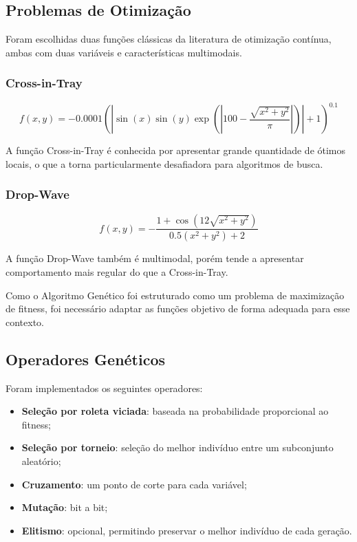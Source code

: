 \documentclass[a4paper,12pt]{article}
\begin{document}
\subsection{Problemas de Otimização}

Foram escolhidas duas funções clássicas da literatura de otimização contínua, ambas com duas variáveis e características multimodais.

\subsubsection{Cross-in-Tray}

\begin{equation}
f(x,y) =
-0.0001
\left(
\left|
\sin(x)\sin(y)
\exp\left(
\left|
100 - \frac{\sqrt{x^2 + y^2}}{\pi}
\right|
\right)
\right|
+ 1
\right)^{0.1}
\end{equation}

A função Cross-in-Tray é conhecida por apresentar grande quantidade de ótimos locais, o que a torna particularmente desafiadora para algoritmos de busca.

\subsubsection{Drop-Wave}

\begin{equation}
f(x,y) =
-
\frac{
1 + \cos(12\sqrt{x^2 + y^2})
}{
0.5(x^2 + y^2) + 2
}
\end{equation}

A função Drop-Wave também é multimodal, porém tende a apresentar comportamento mais regular do que a Cross-in-Tray.

Como o Algoritmo Genético foi estruturado como um problema de maximização de fitness, foi necessário adaptar as funções objetivo de forma adequada para esse contexto.

\subsection{Operadores Genéticos}

Foram implementados os seguintes operadores:

\begin{itemize}
    \item \textbf{Seleção por roleta viciada}: baseada na probabilidade proporcional ao fitness;
    \item \textbf{Seleção por torneio}: seleção do melhor indivíduo entre um subconjunto aleatório;
    \item \textbf{Cruzamento}: um ponto de corte para cada variável;
    \item \textbf{Mutação}: bit a bit;
    \item \textbf{Elitismo}: opcional, permitindo preservar o melhor indivíduo de cada geração.
\end{itemize}
\end{document}
